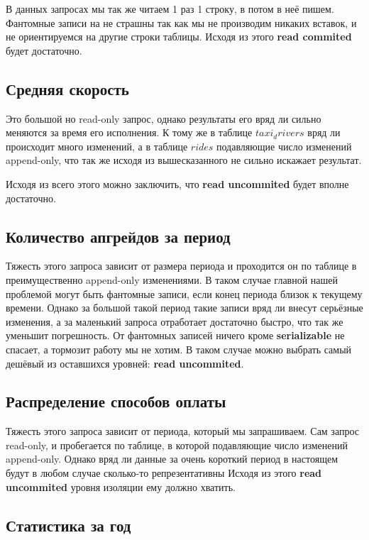 \documentclass[fontsize=12pt]{article}
\begin{document}
В данных запросах мы так же читаем 1 раз 1 строку, в потом в неё пишем. Фантомные записи на не страшны так как мы не производим никаких вставок, и не ориентируемся на другие строки таблицы. Исходя из этого \textbf{read commited} будет достаточно.

\subsection*{Средняя скорость}

Это большой но read-only запрос, однако результаты его вряд ли сильно меняются за время его исполнения. К тому же в таблице $taxi_drivers$ вряд ли происходит много изменений, а в таблице $rides$ подавляющие число изменений append-only, что так же исходя из вышесказанного не сильно искажает результат.

Исходя из всего этого можно заключить, что \textbf{read uncommited} будет вполне достаточно. 

\subsection*{Количество апгрейдов за период}

Тяжесть этого запроса зависит от размера периода и проходится он по таблице в преимущественно append-only изменениями. В таком случае главной нашей проблемой могут быть фантомные записи, если конец периода близок к текущему времени. Однако за большой такой период такие записи вряд ли внесут серьёзные изменения, а за маленький запроса отработает достаточно быстро, что так же уменьшит погрешность. От фантомных записей ничего кроме \textbf{serializable} не спасает, а тормозит работу мы не хотим. В таком случае можно выбрать самый дешёвый из оставшихся уровней: \textbf{read uncommited}.

\subsection*{Распределение способов оплаты}

Тяжесть этого запроса зависит от периода, который мы запрашиваем. Сам запрос read-only, и пробегается по таблице, в которой подавляющие число изменений append-only. Однако вряд ли данные за очень короткий период в настоящем будут в любом случае сколько-то репрезентативны Исходя из этого \textbf{read uncommited} уровня изоляции ему должно хватить.

\subsection*{Статистика за год}
\end{document}
